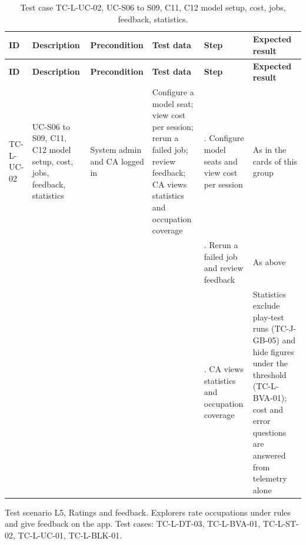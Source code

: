 {\footnotesize{}\renewcommand{\arraystretch}{1.1}
\begin{longtable}{|>{\raggedright\arraybackslash}p{}|>{\raggedright\arraybackslash}p{}|>{\raggedright\arraybackslash}p{}|>{\raggedright\arraybackslash}p{}|>{\raggedright\arraybackslash}p{}|>{\raggedright\arraybackslash}p{}|}
\caption{Test case TC-L-UC-02, UC-S06 to S09, C11, C12 model setup, cost, jobs, feedback, statistics.} \\
\hline
\textbf{ID} & \textbf{Description} & \textbf{Precondition} & \textbf{Test data} & \textbf{Step} & \textbf{Expected result} \\ \hline
\endfirsthead
\hline
\textbf{ID} & \textbf{Description} & \textbf{Precondition} & \textbf{Test data} & \textbf{Step} & \textbf{Expected result} \\ \hline
\endhead
TC-L-UC-02 & UC-S06 to S09, C11, C12 model setup, cost, jobs, feedback, statistics & System admin and CA logged in & Configure a model seat; view cost per session; rerun a failed job; review feedback; CA views statistics and occupation coverage & 1. Configure model seats and view cost per session & As in the cards of this group \\ \cline{5-6}
 &  &  &  & 2. Rerun a failed job and review feedback & As above \\ \cline{5-6}
 &  &  &  & 3. CA views statistics and occupation coverage & Statistics exclude play-test runs (TC-\allowbreak{}J-\allowbreak{}GB-\allowbreak{}05) and hide figures under the threshold (TC-\allowbreak{}L-\allowbreak{}BVA-\allowbreak{}01); cost and error questions are answered from telemetry alone \\ \hline
\end{longtable}
}

Test scenario L5, Ratings and feedback. Explorers rate occupations under rules and give feedback on the app. Test cases: TC-L-DT-03, TC-\allowbreak{}L-\allowbreak{}BVA-\allowbreak{}01, TC-L-ST-02, TC-L-UC-01, TC-\allowbreak{}L-\allowbreak{}BLK-\allowbreak{}01.

